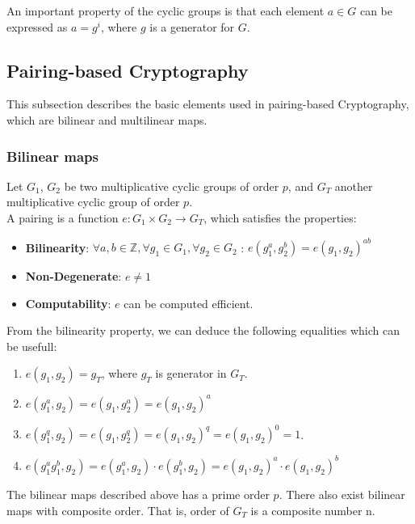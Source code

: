 \documentclass[a4paper, 12pt, oneside]{article}
\begin{document}
\bigskip

An important property of the cyclic groups is that each element $a \in G$ can be expressed as $a = g^i$, where $g$ is a generator for $G$.

\subsection{Pairing-based Cryptography}
This subsection describes the basic elements used in pairing-based Cryptography, which are bilinear and multilinear maps.


\subsubsection{Bilinear maps}
Let $G_1$, $G_2$ be two multiplicative cyclic groups of order $p$, and $G_T$ another multiplicative cyclic group of order $p$.\\

A pairing is a function $e: G_1 \times G_2 \rightarrow G_T$, which satisfies the properties:

\begin{itemize}

\item \textbf{Bilinearity}: $ \forall a, b \in \mathbb{Z}, \forall g_1 \in G_1, \forall g_2 \in G_2 $ : $ e(g_1^a, g_2^b) = e(g_1, g_2)^{ab}$
\item \textbf{Non-Degenerate}: $e \neq 1$
\item \textbf{Computability}: $e$ can be computed efficient.

\end{itemize}

From the bilinearity property, we can deduce the following equalities which can be usefull:
\begin{enumerate}


\item $e(g_1, g_2) = g_T$, where $g_T$ is generator in $G_T$.
\item $e(g_1^a, g_2) = e(g_1, g_2^a) = e(g_1, g_2)^a$
\item $e(g_1^q, g_2) = e(g_1, g_2^q) = e(g_1, g_2)^q = e(g_1, g_2)^0 = 1$.

\item $e(g_1^ag_1^b, g_2) = e(g_1^a, g_2)\cdot e(g_1^b, g_2) = e(g_1, g_2)^a \cdot e(g_1, g_2)^b$

\end{enumerate}


The bilinear maps described above has a prime order $p$. There also exist bilinear maps with composite order. That is, order of $G_T$ is a composite number n.
\end{document}
